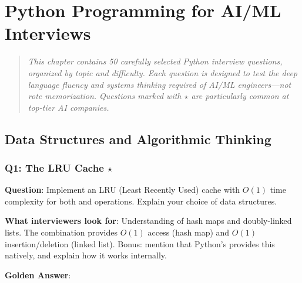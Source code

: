 \chapter{Python Programming for AI/ML Interviews}
\label{ch:python-interviews}

\begin{quote}
\itshape
This chapter contains 50 carefully selected Python interview questions, organized by topic and difficulty. Each question is designed to test the deep language fluency and systems thinking required of AI/ML engineers---not rote memorization. Questions marked with $\star$ are particularly common at top-tier AI companies.
\end{quote}

\vspace{0.5cm}


\section{Data Structures and Algorithmic Thinking}

\subsection{Q1: The LRU Cache $\star$}

\textbf{Question}: Implement an LRU (Least Recently Used) cache with $O(1)$ time complexity for both  and  operations. Explain your choice of data structures.

\textbf{What interviewers look for}: Understanding of hash maps and doubly-linked lists. The combination provides $O(1)$ access (hash map) and $O(1)$ insertion/deletion (linked list). Bonus: mention that Python's  provides this natively, and explain how it works internally.

\textbf{Golden Answer}:

